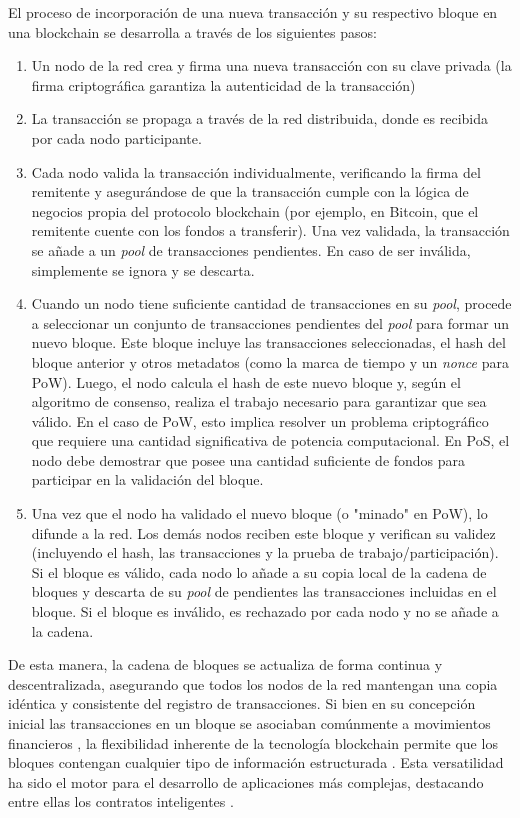 El proceso de incorporación de una nueva transacción y su respectivo bloque en una blockchain se desarrolla a través de los siguientes pasos:

\begin{enumerate}
    \item Un nodo de la red crea y firma una nueva transacción con su clave privada (la firma criptográfica garantiza la autenticidad de la transacción)
    \item La transacción se propaga a través de la red distribuida, donde es recibida por cada nodo participante.
    \item Cada nodo valida la transacción individualmente, verificando la firma del remitente y asegurándose de que la transacción cumple con la lógica de negocios propia del protocolo blockchain (por ejemplo, en Bitcoin, que el remitente cuente con los fondos a transferir). Una vez validada, la transacción se añade a un \textit{pool} de transacciones pendientes. En caso de ser inválida, simplemente se ignora y se descarta. 
    \item Cuando un nodo tiene suficiente cantidad de transacciones en su \textit{pool}, procede a seleccionar un conjunto de transacciones pendientes del \textit{pool} para formar un nuevo bloque. Este bloque incluye las transacciones seleccionadas, el hash del bloque anterior y otros metadatos (como la marca de tiempo y un \textit{nonce} para PoW). Luego, el nodo calcula el hash de este nuevo bloque y, según el algoritmo de consenso, realiza el trabajo necesario para garantizar que sea válido. En el caso de PoW, esto implica resolver un problema criptográfico que requiere una cantidad significativa de potencia computacional. En PoS, el nodo debe demostrar que posee una cantidad suficiente de fondos para participar en la validación del bloque.
    \item Una vez que el nodo ha validado el nuevo bloque (o "minado" en PoW), lo difunde a la red. Los demás nodos reciben este bloque y verifican su validez (incluyendo el hash, las transacciones y la prueba de trabajo/participación). Si el bloque es válido, cada nodo lo añade a su copia local de la cadena de bloques y descarta de su \textit{pool} de pendientes las transacciones incluidas en el bloque. Si el bloque es inválido, es rechazado por cada nodo y no se añade a la cadena.
\end{enumerate}

De esta manera, la cadena de bloques se actualiza de forma continua y descentralizada, asegurando que todos los nodos de la red mantengan una copia idéntica y consistente del registro de transacciones. Si bien en su concepción inicial las transacciones en un bloque se asociaban comúnmente a movimientos financieros \cite{satoshi2008bitcoin}, la flexibilidad inherente de la tecnología blockchain permite que los bloques contengan cualquier tipo de información estructurada \cite{bartolomeo2020introduccion}. Esta versatilidad ha sido el motor para el desarrollo de aplicaciones más complejas, destacando entre ellas los contratos inteligentes \cite{sunny2022systematic}.

